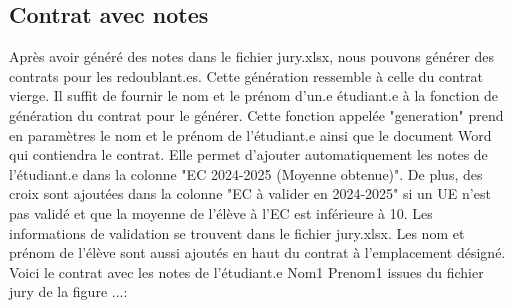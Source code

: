 \subsection{Contrat avec notes }
Après avoir généré des notes dans le fichier jury.xlsx, nous pouvons générer des contrats pour les redoublant.es.
Cette génération ressemble à celle du contrat vierge. Il suffit de fournir le nom et le prénom d'un.e étudiant.e à la fonction de génération du contrat pour le générer.
Cette fonction appelée "generation" prend en paramètres le nom et le prénom de l'étudiant.e ainsi que le document Word qui contiendra le contrat. 
Elle permet d'ajouter automatiquement les notes de l'étudiant.e dans la colonne "EC 2024-2025 (Moyenne obtenue)". De plus, des croix sont ajoutées dans la colonne "EC à valider en 2024-2025" 
si un UE n'est pas validé et que la moyenne de l'élève à l'EC est inférieure à 10.
Les informations de validation se trouvent dans le fichier jury.xlsx.
Les nom et prénom de l'élève sont aussi ajoutés en haut du contrat à l'emplacement désigné.
Voici le contrat avec les notes de l'étudiant.e Nom1 Prenom1 issues du fichier jury de la figure ...:

